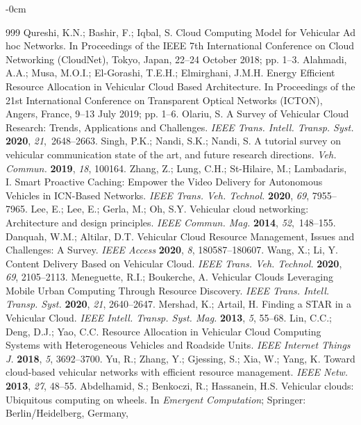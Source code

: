 \documentclass[sensors,article,accept,moreauthors,pdftex]{Definitions/mdpi}
\begin{document}
\begin{adjustwidth}{-\extralength}{0cm}
\begin{thebibliography}{999}
Qureshi, K.N.; Bashir, F.; Iqbal, S. Cloud Computing Model for Vehicular Ad hoc Networks.  In Proceedings of the IEEE 7th International Conference on Cloud Networking (CloudNet), Tokyo, Japan,  22--24 October 2018; pp. 1--3.
Alahmadi, A.A.; Musa, M.O.I.; El-Gorashi, T.E.H.; Elmirghani, J.M.H. Energy Efficient Resource Allocation in Vehicular Cloud Based Architecture. In Proceedings of the 21st International Conference on Transparent Optical Networks (ICTON), Angers, France, 9--13 July 2019; pp. 1--6.
Olariu, S. A Survey of Vehicular Cloud Research: Trends, Applications and Challenges. \emph{IEEE Trans. Intell. Transp. Syst.} \textbf{2020},  \emph{21},~2648--2663.
Singh, P.K.; Nandi, S.K.; Nandi, S. A tutorial survey on vehicular communication state of the art, and future research directions. \emph{Veh. Commun.} \textbf{2019}, \emph{18}, 100164.
Zhang, Z.; Lung, C.H.; St-Hilaire, M.; Lambadaris, I. Smart Proactive Caching: Empower the Video Delivery for Autonomous Vehicles in ICN-Based Networks. \emph{IEEE Trans. Veh. Technol.} \textbf{2020}, \emph{69}, 7955--7965.
Lee, E.; Lee, E.; Gerla, M.; Oh, S.Y. Vehicular cloud networking: Architecture and design principles. \emph{IEEE Commun. Mag.} \textbf{2014}, \emph{52},~148--155.
Danquah, W.M.; Altilar, D.T. Vehicular Cloud Resource Management, Issues and Challenges: A Survey. \emph{IEEE Access} \textbf{2020}, \emph{8}, 180587--180607.
Wang, X.; Li, Y. Content Delivery Based on Vehicular Cloud. \emph{IEEE Trans. Veh. Technol.} \textbf{2020},  \emph{69}, 2105--2113.
Meneguette, R.I.; Boukerche, A. Vehicular Clouds Leveraging Mobile Urban Computing Through Resource Discovery. \emph{IEEE Trans. Intell. Transp. Syst.} \textbf{2020}, \emph{21},  2640--2647.
Mershad, K.; Artail, H. Finding a STAR in a Vehicular Cloud. \emph{IEEE Intell. Transp. Syst. Mag.} \textbf{2013},  \emph{5}, 55--68.
Lin, C.C.; Deng, D.J.; Yao, C.C. Resource Allocation in Vehicular Cloud Computing Systems with Heterogeneous Vehicles and Roadside Units. \emph{IEEE Internet Things J.} \textbf{2018}, \emph{5},  3692--3700. 
Yu, R.; Zhang, Y.; Gjessing, S.; Xia, W.; Yang, K. Toward cloud-based vehicular networks with efficient resource management. \emph{IEEE Netw.} \textbf{2013},  \emph{27}, 48--55.
Abdelhamid, S.; Benkoczi, R.; Hassanein, H.S. Vehicular clouds: Ubiquitous computing on wheels.  In \emph{Emergent Computation}; Springer: {Berlin/Heidelberg, Germany,} %

\end{thebibliography}
\end{adjustwidth}
\end{document}
